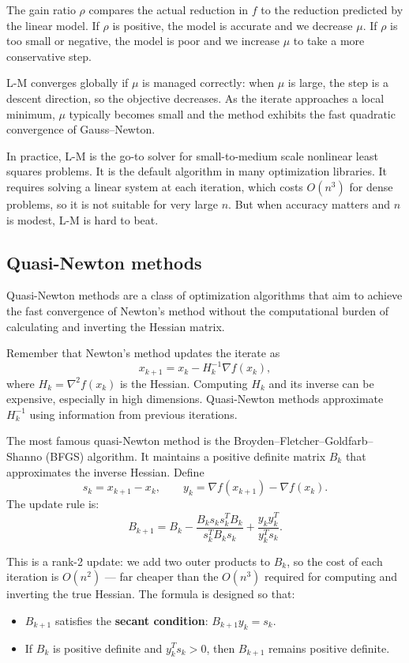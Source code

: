 \documentclass[lang=en,color=blue,mode=fancy,titlestyle=hang]{elegantbook}
\begin{document}
The gain ratio $\rho$ compares the actual reduction in $f$ to the reduction predicted by the linear
model. If $\rho$ is positive, the model is accurate and we decrease $\mu$. If $\rho$ is too small
or negative, the model is poor and we increase $\mu$ to take a more conservative step.

L-M converges globally if $\mu$ is managed correctly: when $\mu$ is large, the step is a descent
direction, so the objective decreases. As the iterate approaches a local minimum, $\mu$ typically
becomes small and the method exhibits the fast quadratic convergence of Gauss–Newton.

In practice, L-M is the go-to solver for small-to-medium scale nonlinear least squares problems.
It is the default algorithm in many optimization libraries. It requires solving a linear system
at each iteration, which costs $O(n^3)$ for dense problems, so it is not suitable for very large
$n$. But when accuracy matters and $n$ is modest, L-M is hard to beat.

\subsection{Quasi-Newton methods}
Quasi-Newton methods are a class of optimization algorithms that aim to achieve the fast convergence
of Newton's method without the computational burden of calculating and inverting the Hessian matrix.

Remember that Newton's method updates the iterate as
\[
x_{k+1} = x_k - H_k^{-1} \nabla f(x_k),
\]
where $H_k = \nabla^2 f(x_k)$ is the Hessian. Computing $H_k$ and its inverse can be expensive,
especially in high dimensions. Quasi-Newton methods approximate $H_k^{-1}$ using information from
previous iterations.

The most famous quasi-Newton method is the Broyden–Fletcher–Goldfarb–Shanno (BFGS) algorithm.
It maintains a positive definite matrix $B_k$ that approximates the inverse Hessian. Define
\[
s_k = x_{k+1} - x_k, \qquad y_k = \nabla f(x_{k+1}) - \nabla f(x_k).
\]
The update rule is:
\[
B_{k+1} = B_k - \frac{B_k s_k s_k^T B_k}{s_k^T B_k s_k} + \frac{y_k y_k^T}{y_k^T s_k}.
\]

This is a rank-2 update: we add two outer products to $B_k$, so the cost of each iteration
is $O(n^2)$ — far cheaper than the $O(n^3)$ required for computing and inverting the true Hessian.
The formula is designed so that:
\begin{itemize}
  \item $B_{k+1}$ satisfies the \textbf{secant condition}: $B_{k+1} y_k = s_k$.
  \item If $B_k$ is positive definite and $y_k^T s_k > 0$, then $B_{k+1}$ remains positive definite.
\end{itemize}
\end{document}
